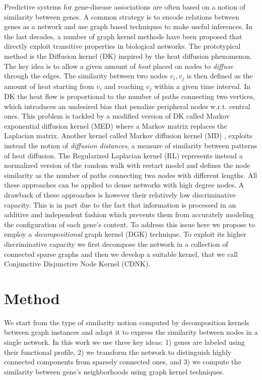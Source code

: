\documentclass{esannV2}
\begin{document}
Predictive systems for gene-disease associations are often based on a notion
of similarity between genes. A common strategy is to encode relations between
genes as a network and use graph based techniques to make useful inferences.
In the last decades, a number of graph kernel methods have been proposed that
directly exploit transitive properties in biological networks. The
prototypical method is the Diffusion kernel (DK) \cite{ledk} inspired by the
heat diffusion phenomenon. The key idea is to allow a given amount of {\em
heat} placed on nodes to {\em diffuse} through the edges. The similarity
between two nodes $v_{i}, v_{j}$ is then defined as the amount of heat
starting from $v_{i}$ and reaching $v_{j}$ within a given time interval. In DK
the heat flow is proportional to the number of paths connecting two vertices,
which introduces an undesired bias that penalize peripheral nodes w.r.t.
central ones. This problem is tackled by a modified version of DK called
Markov exponential diffusion kernel (MED) \cite{medk} where a Markov matrix
replaces the Laplacian matrix.  Another kernel called Markov diffusion kernel
(MD) \cite{mdk}, exploits instead the notion of {\em diffusion distances}, a
measure of similarity between patterns of heat diffusion. The Regularized
Laplacian kernel (RL) \cite{rlk} represents instead a normalized version of
the random walk with restart model and defines the node similarity as the
number of paths connecting two nodes with different lengths. All these
approaches can be applied to dense networks with high degree nodes. A drawback
of these approaches is however their relatively low discriminative capacity.
This is in part due to the fact that information is processed in an additive
and independent fashion which prevents them from accurately modeling the
configuration of each gene's context. To address this issue here we propose to
employ a {\em decompositional} graph kernel (DGK) \cite{covolution_kernel}
technique. To exploit its higher discriminative capacity we first decompose
the network in a collection of connected sparse graphs and then we develop a
suitable kernel, that we call Conjunctive Disjunctive Node Kernel (CDNK).


\section{Method}\label{method} 

We start from the type of similarity notion computed by decomposition kernels
between graph instances and adapt it to express the similarity between nodes
in a single network. In this work we use three key ideas: 1) genes are labeled
using their functional profile, 2) we transform the network to distinguish
highly connected components from sparsely connected ones, and 3) we compute the similarity between gene's neighborhoods using graph kernel techniques.
\end{document}
